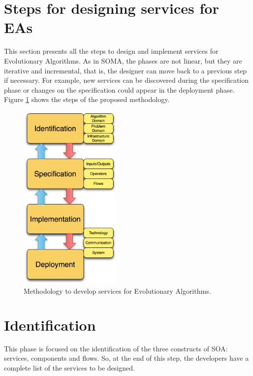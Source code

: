 


\section{Steps for designing services for EAs}
This section presents all the steps to design and implement services for Evolutionary Algorithms.
 As in SOMA, the phases are not linear, but they are iterative and incremental, that is, the designer can move back to a previous step if necessary. For example,
 new services can be discovered during the specification phase or changes on the specification could appear in the deployment phase. Figure \ref{fig:distributed:methodology} shows the steps of the proposed methodology.

\begin{figure}
\centering
\includegraphics[width=5cm]{gfx/soaea/methodology.jpg}
\caption{Methodology to develop services for Evolutionary Algorithms.}
\label{fig:distributed:methodology}
\end{figure}

\section{Identification}
\label{subsec:soaea:identification}

This phase is focused on the identification of the three constructs of SOA: services, components and flows. So, at the end of this step, the developers have a complete list of the services to be designed.

